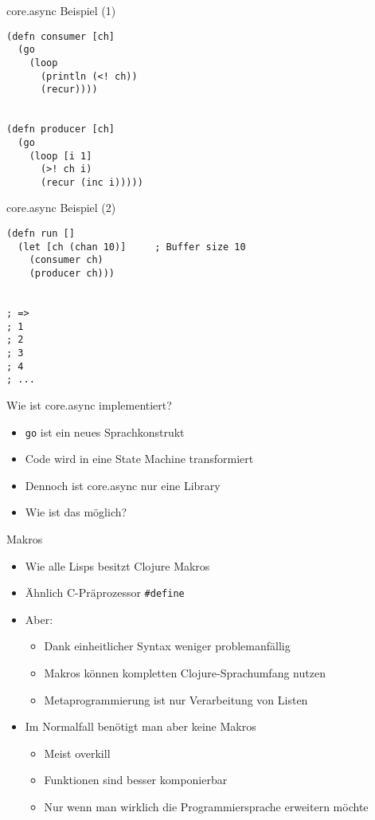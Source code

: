 \documentclass[presentation]{beamer}
\begin{document}
\begin{frame}[fragile]{core.async Beispiel (1)}
  \begin{block}{}
\begin{verbatim}
(defn consumer [ch]
  (go
    (loop
      (println (<! ch))
      (recur))))


(defn producer [ch]
  (go
    (loop [i 1]
      (>! ch i)
      (recur (inc i)))))
\end{verbatim}
  \end{block}
\end{frame}

\begin{frame}[fragile]{core.async Beispiel (2)}
  \begin{block}{}
\begin{verbatim}
(defn run []
  (let [ch (chan 10)]     ; Buffer size 10
    (consumer ch)
    (producer ch)))


; =>
; 1
; 2
; 3
; 4
; ...
\end{verbatim}
  \end{block}
\end{frame}

\begin{frame}[fragile]{Wie ist core.async implementiert?}
  \begin{itemize}
  \item \lstinline{go} ist ein neues Sprachkonstrukt
  \item Code wird in eine State Machine transformiert
  \item Dennoch ist core.async nur eine Library
  \item Wie ist das möglich?
  \end{itemize}
\end{frame}

\begin{frame}[fragile]{Makros}
  \begin{itemize}
  \item Wie alle Lisps besitzt Clojure Makros
  \item Ähnlich C-Präprozessor \lstinline{#define}
  \item Aber:
    \begin{itemize}
    \item Dank einheitlicher Syntax weniger problemanfällig
    \item Makros können kompletten Clojure-Sprachumfang nutzen
    \item Metaprogrammierung ist nur Verarbeitung von Listen
    \end{itemize}
  \item Im Normalfall benötigt man aber keine Makros
    \begin{itemize}
    \item Meist overkill
    \item Funktionen sind besser komponierbar
    \item Nur wenn man wirklich die Programmiersprache erweitern möchte
    \end{itemize}
  \end{itemize}
\end{frame}
\end{document}
